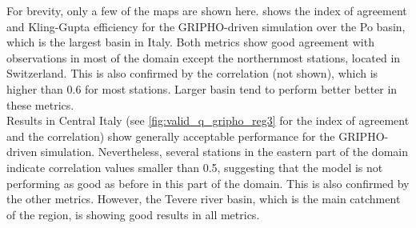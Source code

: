 For brevity, only a few of the maps are shown here. %
 shows the index of agreement and Kling-Gupta efficiency for the GRIPHO-driven simulation over the Po basin, which is the largest basin in Italy.
Both metrics show good agreement with observations in most of the domain except the northernmost stations, located in Switzerland. This is also confirmed by the correlation (not shown), which is higher than 0.6 for most stations.
Larger basin tend to perform better better in these metrics.\\
Results in Central Italy (see \cref{fig:valid_q_gripho_reg3} for the index of agreement and the correlation) show generally acceptable performance for the GRIPHO-driven simulation.
Nevertheless, several stations in the eastern part of the domain indicate correlation values smaller than 0.5, suggesting that the model is not performing as good as before in this part of the domain.
This is also confirmed by the other metrics.
However, the Tevere river basin, which is the main catchment of the region, is showing good results in all metrics.
